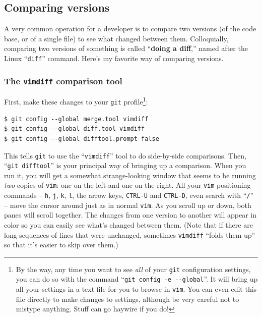 \subsection{Comparing versions}

A very common operation for a developer is to compare two versions (of the
code base, or of a single file) to see what changed between them.
Colloquially, comparing two versions of something is called ``\textbf{doing a
diff},'' named after the Linux ``\texttt{diff}'' command. Here's my favorite
way of comparing versions.

\subsubsection{The \texttt{vimdiff} comparison tool}

First, make these changes to your \texttt{git} profile\footnote{By the way,
any time you want to see \textit{all} of your \texttt{git} configuration
settings, you can do so with the command ``\texttt{git config -e -{}-global}''.
It will bring up all your settings in a text file for you to browse in
\texttt{vim}. You can even edit this file directly to make changes to
settings, although be very careful not to mistype anything. Stuff can go
haywire if you do!}:

\begin{Verbatim}[fontsize=\small,samepage=true,frame=none]
$ git config --global merge.tool vimdiff
$ git config --global diff.tool vimdiff
$ git config --global difftool.prompt false
\end{Verbatim}

This tells \texttt{git} to use the ``\texttt{vimdiff}'' tool to do
side-by-side comparisons. Then, ``\texttt{git difftool}'' is your principal
way of bringing up a comparison. When you run it, you will get a somewhat
strange-looking window that seems to be running \textit{two} copies of
\texttt{vim}: one on the left and one on the right. All your \texttt{vim}
positioning commands -- \texttt{h}, \texttt{j}, \texttt{k}, \texttt{l}, the
arrow keys, \texttt{CTRL-U} and \texttt{CTRL-D}, even search with
``\texttt{/}'' -- move the cursor around just as in normal \texttt{vim}. As
you scroll up or down, both panes will scroll together. The changes from one
version to another will appear in color so you can easily see what's changed
between them. (Note that if there are long sequences of lines that were
unchanged, sometimes \texttt{vimdiff} ``folds them up'' so that it's easier to
skip over them.) 

